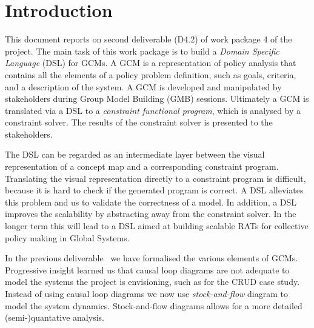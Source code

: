 \section{Introduction}\label{introduction}





This document reports on second deliverable (D4.2) of work package 4 of the
\grace project. The main task of this work package is to build a \emph{Domain
Specific Language} (DSL) for \acp{GCM}. A \ac{GCM} is a representation of policy
analysis that contains all the elements of a policy problem definition, such as
goals, criteria, and a description of the system. A GCM is developed and
manipulated by stakeholders during Group Model Building (GMB) sessions.
Ultimately a GCM is translated via a DSL to a \emph{constraint functional
program}, which is analysed by a constraint solver. The results of the
constraint solver is presented to the stakeholders.

The DSL can be regarded as an intermediate layer between the visual
representation of a \grace concept map and a corresponding constraint program.
Translating the visual representation directly to a constraint program is
difficult, because it is hard to check if the generated program is correct. A
DSL alleviates this problem and us to validate the correctness of a model. In
addition, a DSL improves the scalability by abstracting away from the constraint
solver. In the longer term this will lead to a DSL aimed at building scalable
RATs for collective policy making in Global Systems.  


In the previous deliverable~\cite{d4.1} we have formalised the various elements
of \acp{GCM}. Progressive insight learned us that causal loop diagrams are not
adequate to model the systems the project is envisioning, such as for the CRUD
case study. Instead of using causal loop diagrams we now use
\emph{stock-and-flow} diagram to model the system dynamics. Stock-and-flow
diagrams allows for a more detailed (semi-)quantative analysis.


